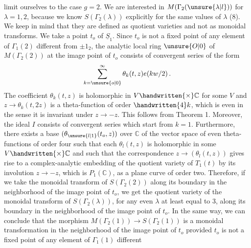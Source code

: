 limit ourselves to the case $g=2$. We are interested in $M(\Gamma_{2}(\unsure{\lambda|l}))$ for $\lambda=1,2$, because we know $S(\Gamma_{2}(\lambda))$ explicitly for the same values of $\lambda$ (8). We keep in mind that they are defined as quotient varieties and not as monoidal transforms. We take a point $t_{o}$ of $\underline{S}_{1}$. Since $t_{o}$ is not a fixed point of any element of $\Gamma_{1}(2)$ different from $\pm1_{2}$, the analytic local ring $\unsure{O|0}$ of $M(\Gamma_{2}(2))$ at the image point of $t_{o}$ consists of convergent series of the form
\[
\sum_{k=\unsure{o|0}}^{\infty}\theta_{k}(t,z)e(kw/2)\,.
\]
The coefficient $\theta_{k}(t,z)$ is holomorphic in $V\handwritten{\times}\mathbb{C}$ for some $V$ and $z\longrightarrow\theta_{k}(t,2z)$ is a theta-function of order $\handwritten{4}k$, which is even in the sense it is invariant under $z\longrightarrow-z$. This follows from Theorem 1. Moreover, the ideal $I$ consists of convergent series which start from $k=1$. Furthermore, there exists a base $(\theta_{\unsure{l|1}}(t_{o},z))$ over $\mathbb{C}$ of the vector space of even theta-functions of order four such that each $\theta_{l}(t,z)$ is holomorphic in some $V\handwritten{\times}\mathbb{C}$ and such that the correspondence $z\longrightarrow(\theta_{l}(t,z))$ gives rise to a complex-analytic embedding of the quotient variety of $T_{1}(t)$ by its involution $z\longrightarrow-z$, which is $P_{1}(\mathbb{C})$, as a plane curve of order two. Therefore, if we take the monoidal transform of $S(\Gamma_{2}(2))$ along its boundary in the neighborhood of the image point of $t_{o}$, we get the quotient variety of the monoidal transform of $S(\Gamma_{2}(\lambda))$, for any even $\lambda$ at least equal to 3, along its boundary in the neighborhood of the image point of $t_{o}$. In the same way, we can conclude that the morphism $M(\Gamma_{2}(1))\longrightarrow S(\Gamma_{2}(1))$ is a monoidal transformation in the neighborhood of the image point of $t_{o}$ provided $t_{o}$ is not a fixed point of any element of $\Gamma_{1}(1)$ different


